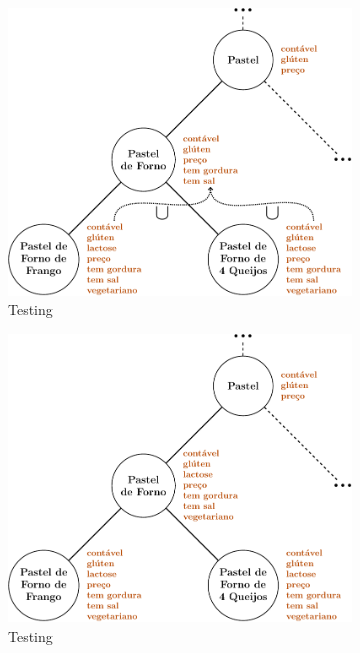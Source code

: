 \documentclass[10pt,a4paper]{article}
\begin{document}
	\begin{figure}
		\caption{Testing}
		\centering
		\begin{subfigure}{0.49\linewidth}
			\includegraphics[width=0.9\linewidth]{../bottomup-1.pdf}
			\caption{Testing}
		\end{subfigure}
		\begin{subfigure}{0.49\linewidth}
			\includegraphics[width=0.9\linewidth]{../bottomup-2.pdf}
			\caption{Testing}
		\end{subfigure}
		\\
		\begin{subfigure}{0.49\linewidth}

\end{subfigure}
\end{figure}
\end{document}
